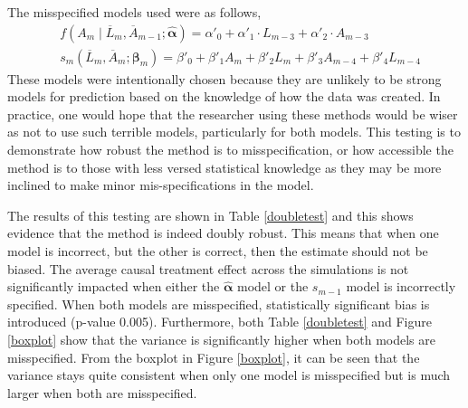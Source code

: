 The misspecified models used were as follows, 
\begin{align} 
&f(A_m \mid \overline{L}_m, \overline{A}_{m-1}; \hat{\mathbf{\alpha}}) = \alpha'_{0} + \alpha'_{1} \cdot L_{m-3} + \alpha'_{2} \cdot A_{m-3} \\ 
&s_{m}(\overline{L}_{m}, \overline{A}_{m};\mathbf{\beta}_{m}) = \beta'_0 + \beta'_1 A_{m} +\beta'_2 L_m  +\beta'_3 A_{m-4} +  \beta'_4 L_{m-4} 
 \end{align} 
These models were intentionally chosen because they are unlikely to be strong models for prediction based on the knowledge of how the data was created.  In practice, one would hope that the researcher using these methods would be wiser as not to use such terrible models, particularly for both models.  This testing is to demonstrate how robust the method is to misspecification, or how accessible the method is to those with less versed statistical knowledge as they may be more inclined to make minor mis-specifications in the model.  

The results of this testing are shown in Table \ref{doubletest} and this shows evidence that the method is indeed doubly robust.  This means that when one model is incorrect, but the other is correct, then the estimate should not be biased.  The average causal treatment effect across the simulations is not significantly impacted when either the $\hat{\mathbf{\alpha}}$ model or the $s_{m-1}$ model is incorrectly specified.  When both models are misspecified, statistically significant bias is introduced (p-value 0.005).  Furthermore, both Table \ref{doubletest} and Figure \ref{boxplot} show that the variance is significantly higher when both models are misspecified.  From the boxplot in Figure \ref{boxplot}, it can be seen that the variance stays quite consistent when only one model is misspecified but is much larger when both are misspecified.  

